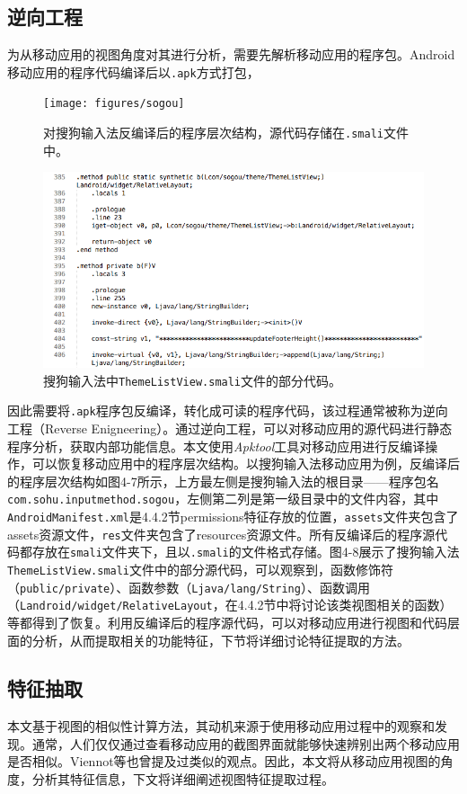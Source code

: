 \subsection{逆向工程}
为从移动应用的视图角度对其进行分析，需要先解析移动应用的程序包。Android移动应用的程序代码编译后以\texttt{.apk}方式打包，
\begin{figure}
	\centering
	\texttt{[image: figures/sogou]}
	\caption{对搜狗输入法反编译后的程序层次结构，源代码存储在\texttt{.smali}文件中。}
\end{figure}
\begin{figure}
	\centering
	\includegraphics[width=5in]{figures/smali}
	\caption{搜狗输入法中\texttt{ThemeListView.smali}文件的部分代码。}
\end{figure}
因此需要将\texttt{.apk}程序包反编译，转化成可读的程序代码，该过程通常被称为逆向工程（Reverse Enigneering）\cite{chikofsky1990reverse}。通过逆向工程，可以对移动应用的源代码进行静态程序分析，获取内部功能信息。本文使用\textit{Apktool}\cite{apktool}工具对移动应用进行反编译操作，可以恢复移动应用中的程序层次结构。以搜狗输入法移动应用为例，反编译后的程序层次结构如图4-7所示，上方最左侧是搜狗输入法的根目录——程序包名\texttt{com.sohu.inputmethod.sogou}，左侧第二列是第一级目录中的文件内容，其中\texttt{AndroidManifest.xml}是4.4.2节permissions特征存放的位置，\texttt{assets}文件夹包含了assets资源文件，\texttt{res}文件夹包含了resources资源文件。所有反编译后的程序源代码都存放在\texttt{smali}文件夹下，且以\texttt{.smali}的文件格式存储。图4-8展示了搜狗输入法\texttt{ThemeListView.smali}文件中的部分源代码，可以观察到，函数修饰符（\texttt{public/private}）、函数参数（\texttt{Ljava/lang/String}）、函数调用（\texttt{Landroid/widget/RelativeLayout}，在4.4.2节中将讨论该类视图相关的函数）等都得到了恢复。利用反编译后的程序源代码，可以对移动应用进行视图和代码层面的分析，从而提取相关的功能特征，下节将详细讨论特征提取的方法。


\subsection{特征抽取}
本文基于视图的相似性计算方法，其动机来源于使用移动应用过程中的观察和发现。通常，人们仅仅通过查看移动应用的截图界面就能够快速辨别出两个移动应用是否相似。Viennot等\cite{viennot2014measurement}也曾提及过类似的观点。因此，本文将从移动应用视图的角度，分析其特征信息，下文将详细阐述视图特征提取过程。

